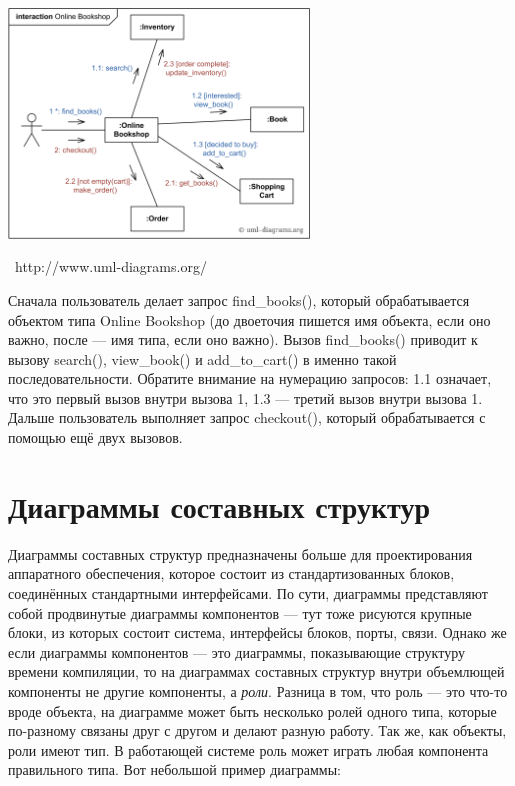 \documentclass[a5paper]{article}
\newcommand{\attribution}[1] {
	\vspace{-5mm}\begin{flushright}\begin{scriptsize}%
	{\textcopyright\, #1}\end{scriptsize}\end{flushright}
}
\begin{document}
\begin{center}
	\includegraphics[width=0.6\textwidth]{communicationDiagramExample.png}
	\attribution{http://www.uml-diagrams.org/}
\end{center}

Сначала пользователь делает запрос find\_books(), который обрабатывается объектом типа Online Bookshop (до двоеточия пишется имя объекта, если оно важно, после --- имя типа, если оно важно). Вызов find\_books() приводит к вызову search(), view\_book() и add\_to\_cart() в именно такой последовательности. Обратите внимание на нумерацию запросов: 1.1 означает, что это первый вызов внутри вызова 1, 1.3 --- третий вызов внутри вызова 1. Дальше пользователь выполняет запрос checkout(), который обрабатывается с помощью ещё двух вызовов.

\section{Диаграммы составных структур}

Диаграммы составных структур предназначены больше для проектирования аппаратного обеспечения, которое состоит из стандартизованных блоков, соединённых стандартными интерфейсами. По сути, диаграммы представляют собой продвинутые диаграммы компонентов --- тут тоже рисуются крупные блоки, из которых состоит система, интерфейсы блоков, порты, связи. Однако же если диаграммы компонентов --- это диаграммы, показывающие структуру времени компиляции, то на диаграммах составных структур внутри объемлющей компоненты не другие компоненты, а \textit{роли}. Разница в том, что роль --- это что-то вроде объекта, на диаграмме может быть несколько ролей одного типа, которые по-разному связаны друг с другом и делают разную работу. Так же, как объекты, роли имеют тип. В работающей системе роль может играть любая компонента правильного типа. Вот небольшой пример диаграммы:
\end{document}
